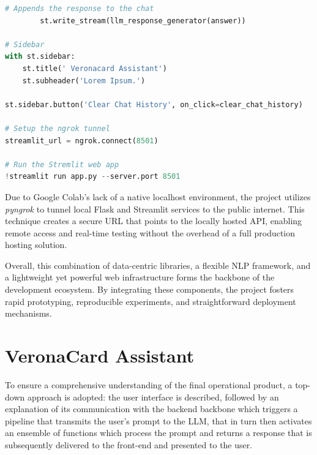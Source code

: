 \begin{center}
\begin{lstlisting}[language=Python, frame=single, caption=Flask API Internal Service]
        # Appends the response to the chat
        st.write_stream(llm_response_generator(answer))
    
# Sidebar
with st.sidebar:
    st.title(' Veronacard Assistant')
    st.subheader('Lorem Ipsum.')
    
st.sidebar.button('Clear Chat History', on_click=clear_chat_history)

# Setup the ngrok tunnel
streamlit_url = ngrok.connect(8501)

# Run the Stremlit web app
!streamlit run app.py --server.port 8501
\end{lstlisting}
\end{center}

Due to Google Colab’s lack of a native localhost environment, the project utilizes \textit{pyngrok} to tunnel local Flask and Streamlit services to the public internet. This technique creates a secure URL that points to the locally hosted API, enabling remote access and real-time testing without the overhead of a full production hosting solution.

Overall, this combination of data-centric libraries, a flexible NLP framework, and a lightweight yet powerful web infrastructure forms the backbone of the development ecosystem. By integrating these components, the project fosters rapid prototyping, reproducible experiments, and straightforward deployment mechanisms.




\section{VeronaCard Assistant}
\label{sec:veronacard-assistant}

To ensure a comprehensive understanding of the final operational product, a top-down approach is adopted:  the user interface is described, followed by an explanation of its communication with the backend backbone which triggers a pipeline that transmits the user's prompt to the LLM, that in turn then activates an ensemble of functions which process the prompt and returns a response that is subsequently delivered to the front-end and presented to the user.

